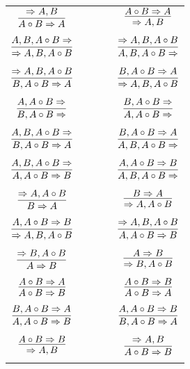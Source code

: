 \documentclass[11pt]{article}
\begin{document}
\begin{center}
\begin{tabular}{ccc}
$\infer{A\circ B\Rightarrow A}{\Rightarrow A, B}$ & \ \ \ \ & $\infer{\Rightarrow A, B}{A\circ B\Rightarrow A}$ \\
&& \\
$\infer{\Rightarrow A, B, A\circ B}{A, B, A\circ B\Rightarrow }$ && $\infer{A, B, A\circ B\Rightarrow }{\Rightarrow A, B, A\circ B}$ \\
&& \\
$\infer{B, A\circ B\Rightarrow A}{\Rightarrow A, B, A\circ B}$ && $\infer{\Rightarrow A, B, A\circ B}{B, A\circ B\Rightarrow A}$ \\
&& \\
$\infer{B, A\circ B\Rightarrow }{A, A\circ B\Rightarrow }$ && $\infer{A, A\circ B\Rightarrow }{B, A\circ B\Rightarrow }$ \\
&& \\
$\infer{B, A\circ B\Rightarrow A}{A, B, A\circ B\Rightarrow }$ && $\infer{A, B, A\circ B\Rightarrow }{B, A\circ B\Rightarrow A}$ \\
&& \\
$\infer{A, A\circ B\Rightarrow B}{A, B, A\circ B\Rightarrow }$ && $\infer{A, B, A\circ B\Rightarrow }{A, A\circ B\Rightarrow B}$ \\
&& \\
$\infer{B\Rightarrow A}{\Rightarrow A, A\circ B}$ && $\infer{\Rightarrow A, A\circ B}{B\Rightarrow A}$ \\
&& \\
$\infer{\Rightarrow A, B, A\circ B}{A, A\circ B\Rightarrow B}$ && $\infer{A, A\circ B\Rightarrow B}{\Rightarrow A, B, A\circ B}$ \\
&& \\
$\infer{A\Rightarrow B}{\Rightarrow B, A\circ B}$ && $\infer{\Rightarrow B, A\circ B}{A\Rightarrow B}$ \\
&& \\
$\infer{A\circ B\Rightarrow B}{A\circ B\Rightarrow A}$ && $\infer{A\circ B\Rightarrow A}{A\circ B\Rightarrow B}$ \\
&& \\
$\infer{A, A\circ B\Rightarrow B}{B, A\circ B\Rightarrow A}$ && $\infer{B, A\circ B\Rightarrow A}{A, A\circ B\Rightarrow B}$ \\
&& \\
$\infer{\Rightarrow A, B}{A\circ B\Rightarrow B}$ && $\infer{A\circ B\Rightarrow B}{\Rightarrow A, B}$ \\
&& \\


\end{tabular}
\end{center}
\end{document}
